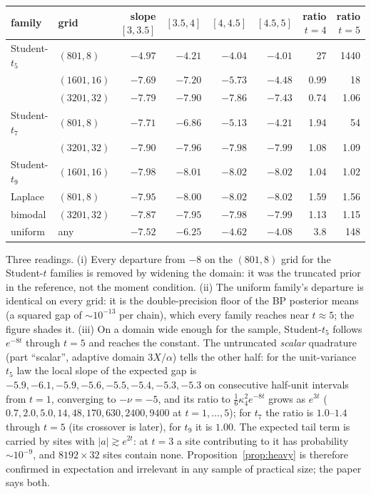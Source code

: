\begin{center}\small
\begin{tabular}{@{}llrrrrrr@{}}
\toprule
family & grid & slope $[3,3.5]$ & $[3.5,4]$ & $[4,4.5]$ & $[4.5,5]$ & ratio $t=4$ & ratio $t=5$ \\
\midrule
Student-$t_5$ & $(801,8)$ & $-4.97$ & $-4.21$ & $-4.04$ & $-4.01$ & 27 & 1440 \\
 & $(1601,16)$ & $-7.69$ & $-7.20$ & $-5.73$ & $-4.48$ & 0.99 & 18 \\
 & $(3201,32)$ & $-7.79$ & $-7.90$ & $-7.86$ & $-7.43$ & 0.74 & 1.06 \\
Student-$t_7$ & $(801,8)$ & $-7.71$ & $-6.86$ & $-5.13$ & $-4.21$ & 1.94 & 54 \\
 & $(3201,32)$ & $-7.90$ & $-7.96$ & $-7.98$ & $-7.99$ & 1.08 & 1.09 \\
Student-$t_9$ & $(1601,16)$ & $-7.98$ & $-8.01$ & $-8.02$ & $-8.02$ & 1.04 & 1.02 \\
Laplace & $(801,8)$ & $-7.95$ & $-8.00$ & $-8.02$ & $-8.02$ & 1.59 & 1.56 \\
bimodal & $(3201,32)$ & $-7.87$ & $-7.95$ & $-7.98$ & $-7.99$ & 1.13 & 1.15 \\
uniform & any & $-7.52$ & $-6.25$ & $-4.62$ & $-4.08$ & 3.8 & 148 \\
\bottomrule
\end{tabular}
\end{center}

Three readings. (i) Every departure from $-8$ on the $(801,8)$ grid for the Student-$t$ families is removed by widening the domain: it was the truncated prior in the reference, not the moment condition. (ii) The uniform family's departure is identical on every grid: it is the double-precision floor of the BP posterior means (a squared gap of $\sim10^{-13}$ per chain), which every family reaches near $t\approx5$; the figure shades it. (iii) On a domain wide enough for the sample, Student-$t_5$ follows $e^{-8t}$ through $t=5$ and reaches the constant. The untruncated \emph{scalar} quadrature (part ``scalar'', adaptive domain $3X/\alpha$) tells the other half: for the unit-variance $t_5$ law the local slope of the expected gap is $-5.9, -6.1, -5.9, -5.6, -5.5, -5.4, -5.3, -5.3$ on consecutive half-unit intervals from $t=1$, converging to $-\nu=-5$, and its ratio to $\tfrac16\kappa_4^2e^{-8t}$ grows as $e^{3t}$ ($0.7, 2.0, 5.0, 14, 48, 170, 630, 2400, 9400$ at $t=1,\dots,5$); for $t_7$ the ratio is $1.0$--$1.4$ through $t=5$ (its crossover is later), for $t_9$ it is $1.00$. The expected tail term is carried by sites with $|a|\gtrsim e^{2t}$: at $t=3$ a site contributing to it has probability $\sim10^{-9}$, and $8192\times32$ sites contain none. Proposition~\ref{prop:heavy} is therefore confirmed in expectation and irrelevant in any sample of practical size; the paper says both.

